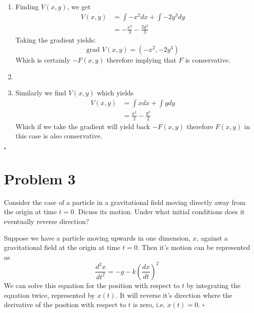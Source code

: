 \documentclass[11pt]{article}
\newenvironment{proof}{\noindent{\bf Proof.}}{\hfill $\square$\medskip}
\begin{document}
\begin{proof}
    \begin{enumerate}[label=\textbf{(\alph*)}]
        \item Finding $V(x,y)$, we get
        \begin{equation}
            \begin{split}
                V(x,y)&=\int -x^{2}dx+\int -2y^{3}dy\\
                &=-\frac{x^{3}}{3}-\frac{2y^{3}}{3}
            \end{split}
        \end{equation}
        Taking the gradient yields:
        $$\text{grad }V(x,y)=(-x^{2},-2y^{3})$$
        Which is certainly $-F(x,y)$ therefore implying that $F$ is conservative.
        \item
        \item Similarly we find $V(x,y)$ which yields
        \begin{equation}
            \begin{split}
                V(x,y)&=\int xdx+\int ydy\\
                &=\frac{x^{2}}{2}-\frac{y^{2}}{2}
            \end{split}
        \end{equation}
        Which if we take the gradient will yield back $-F(x,y)$ therefore $F(x,y)$ in this case is also conservative.
    \end{enumerate}
    
\end{proof}

\section{Problem 3}
Consider the case of a particle in a gravitational field moving directly away from the origin at time $t=0$. Dicuss its 
motion. Under what initial conditions does it eventually reverse direction?

\begin{proof}
Suppose we have a particle moving upwards in one dimension, $x$, against a gravitational field at the origin at time $t=0$.
Then it's motion can be represented as
$$\frac{d^{2}x}{dt^{2}}=-g-k\left(\frac{dx}{dt}\right)^{2}$$
We can solve this equation for the position with respect to $t$ by integrating the equation twice, represented by $x(t)$.
It will reverse it's direction where the derivative of the position with respect to $t$ is zero, i.e. $\dot{x}(t)=0$.
\end{proof}
\end{document}
